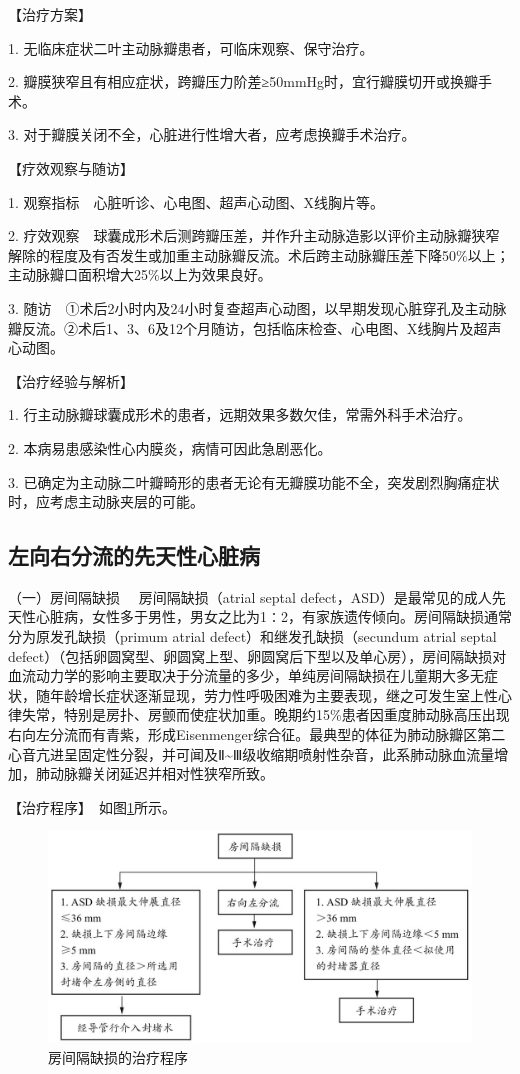 【治疗方案】

1. 无临床症状二叶主动脉瓣患者，可临床观察、保守治疗。

2. 瓣膜狭窄且有相应症状，跨瓣压力阶差≥50mmHg时，宜行瓣膜切开或换瓣手术。

3. 对于瓣膜关闭不全，心脏进行性增大者，应考虑换瓣手术治疗。

【疗效观察与随访】

1. 观察指标　心脏听诊、心电图、超声心动图、X线胸片等。

2.
疗效观察　球囊成形术后测跨瓣压差，并作升主动脉造影以评价主动脉瓣狭窄解除的程度及有否发生或加重主动脉瓣反流。术后跨主动脉瓣压差下降50\%以上；主动脉瓣口面积增大25\%以上为效果良好。

3.
随访　①术后2小时内及24小时复查超声心动图，以早期发现心脏穿孔及主动脉瓣反流。②术后1、3、6及12个月随访，包括临床检查、心电图、X线胸片及超声心动图。

【治疗经验与解析】

1. 行主动脉瓣球囊成形术的患者，远期效果多数欠佳，常需外科手术治疗。

2. 本病易患感染性心内膜炎，病情可因此急剧恶化。

3.
已确定为主动脉二叶瓣畸形的患者无论有无瓣膜功能不全，突发剧烈胸痛症状时，应考虑主动脉夹层的可能。

\subsection{左向右分流的先天性心脏病}

{（一）房间隔缺损} 　房间隔缺损（atrial septal
defect，ASD）是最常见的成人先天性心脏病，女性多于男性，男女之比为1∶2，有家族遗传倾向。房间隔缺损通常分为原发孔缺损（primum
atrial defect）和继发孔缺损（secundum atrial septal
defect）（包括卵圆窝型、卵圆窝上型、卵圆窝后下型以及单心房），房间隔缺损对血流动力学的影响主要取决于分流量的多少，单纯房间隔缺损在儿童期大多无症状，随年龄增长症状逐渐显现，劳力性呼吸困难为主要表现，继之可发生室上性心律失常，特别是房扑、房颤而使症状加重。晚期约15\%患者因重度肺动脉高压出现右向左分流而有青紫，形成Eisenmenger综合征。最典型的体征为肺动脉瓣区第二心音亢进呈固定性分裂，并可闻及Ⅱ\textasciitilde{}Ⅲ级收缩期喷射性杂音，此系肺动脉血流量增加，肺动脉瓣关闭延迟并相对性狭窄所致。

【治疗程序】　如图\ref{fig2-9-1}所示。

\begin{figure}[!htbp]
 \centering
 \includegraphics{./images/Image00077.jpg}
 \captionsetup{justification=centering}
 \caption{房间隔缺损的治疗程序}
 \label{fig2-9-1}
  \end{figure} 

